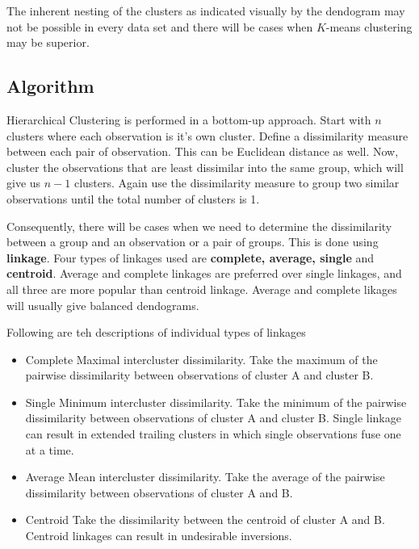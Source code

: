 \documentclass[../statistical_learning_notes.tex]{subfiles}
\begin{document}
    The inherent nesting of the clusters as indicated visually by the dendogram may not be possible in every data set and there will be cases when $K$-means clustering may be superior.


    \subsection{Algorithm}\label{sec:gmm_algo}
    Hierarchical Clustering is performed in a bottom-up approach. Start with $n$ clusters where each observation is it's own cluster. Define a dissimilarity measure between each pair of observation. This can be Euclidean distance as well. Now, cluster the observations that are least dissimilar into the same group, which will give us $n-1$ clusters. Again use the dissimilarity measure to group two similar observations until the total number of clusters is 1.\newline

    Consequently, there will be cases when we need to determine the dissimilarity between a group and an observation or a pair of groups. This is done using \textbf{linkage}. Four types of linkages used are \textbf{complete, average, single} and \textbf{centroid}. Average and complete linkages are preferred over single linkages, and all three are more popular than centroid linkage. Average and complete likages will usually give balanced dendograms.\newline

    Following are teh descriptions of individual types of linkages
    \begin{itemize}
         \item Complete\newline
         Maximal intercluster dissimilarity. Take the maximum of the pairwise dissimilarity between observations of cluster A and cluster B.
         \item Single\newline
         Minimum intercluster dissimilarity. Take the minimum of the pairwise dissimilarity between observations of cluster A and cluster B.\newline
         Single linkage can result in extended trailing clusters in which single observations fuse one at a time.
         \item Average\newline
         Mean intercluster dissimilarity. Take the average of the pairwise dissimilarity between observations of cluster A and B.
         \item Centroid\newline
         Take the dissimilarity between the centroid of cluster A and B. Centroid linkages can result in undesirable inversions.
    \end{itemize}
\end{document}
